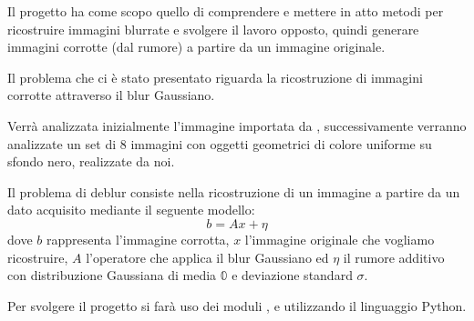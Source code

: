  
Il progetto ha come scopo quello di comprendere e mettere in atto metodi per ricostruire 
immagini blurrate e svolgere il lavoro opposto, quindi generare immagini corrotte (dal rumore) a partire da un immagine 
originale. 

Il problema che ci è stato presentato riguarda la ricostruzione di 
immagini corrotte attraverso il blur Gaussiano.

Verrà analizzata inizialmente l'immagine  importata da
, successivamente verranno analizzate un set di 8 immagini con oggetti geometrici di colore uniforme su sfondo
 nero, realizzate da noi.

Il problema di deblur consiste nella ricostruzione di un immagine a partire da un dato acquisito mediante il seguente modello:
\[b=Ax+\eta\]
dove $b$ rappresenta l'immagine corrotta, $x$ l'immagine originale che vogliamo ricostruire, $A$ l'operatore che applica il 
blur Gaussiano ed $\eta$ il rumore additivo con distribuzione Gaussiana di  media $\mathbb{0}$ e deviazione standard $\sigma$.

Per svolgere il progetto si farà uso dei moduli ,  e 
utilizzando il linguaggio Python.
